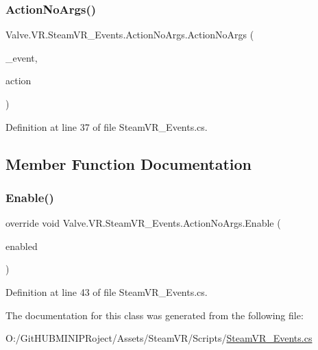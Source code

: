 \subsubsection{\texorpdfstring{ActionNoArgs()}{ActionNoArgs()}}
{\footnotesize\ttfamily Valve.\+V\+R.\+Steam\+V\+R\+\_\+\+Events.\+Action\+No\+Args.\+Action\+No\+Args (\begin{DoxyParamCaption}\item[{\mbox{\hyperlink{class_valve_1_1_v_r_1_1_steam_v_r___events_1_1_event}{Event}}}]{\+\_\+event,  }\item[{Unity\+Action}]{action }\end{DoxyParamCaption})}



Definition at line 37 of file Steam\+V\+R\+\_\+\+Events.\+cs.



\subsection{Member Function Documentation}
\mbox{\label{class_valve_1_1_v_r_1_1_steam_v_r___events_1_1_action_no_args_a2e2ea6edeefdd43950cbeb6fd2313441}} 
\subsubsection{\texorpdfstring{Enable()}{Enable()}}
{\footnotesize\ttfamily override void Valve.\+V\+R.\+Steam\+V\+R\+\_\+\+Events.\+Action\+No\+Args.\+Enable (\begin{DoxyParamCaption}\item[{bool}]{enabled }\end{DoxyParamCaption})}



Definition at line 43 of file Steam\+V\+R\+\_\+\+Events.\+cs.



The documentation for this class was generated from the following file\+:\begin{DoxyCompactItemize}
\item 
O\+:/\+Git\+H\+U\+B\+M\+I\+N\+I\+P\+Roject/\+Assets/\+Steam\+V\+R/\+Scripts/\mbox{\hyperlink{_steam_v_r___events_8cs}{Steam\+V\+R\+\_\+\+Events.\+cs}}\end{DoxyCompactItemize}
